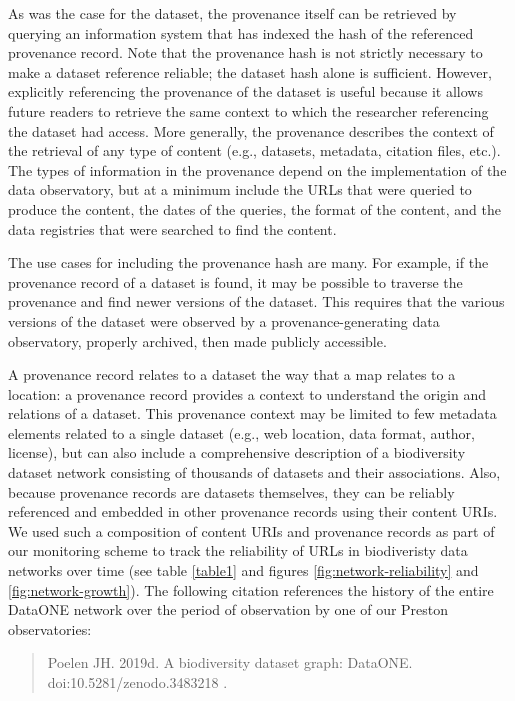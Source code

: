 As was the case for the dataset, the provenance itself can be retrieved by querying an information system that has indexed the hash of the referenced provenance record. Note that the provenance hash is not strictly necessary to make a dataset reference reliable; the dataset hash alone is sufficient. However, explicitly referencing the provenance of the dataset is useful because it allows future readers to retrieve the same context to which the researcher referencing the dataset had access. More generally, the provenance describes the context of the retrieval of any type of content (e.g., datasets, metadata, citation files, etc.). The types of information in the provenance depend on the implementation of the data observatory, but at a minimum include the URLs that were queried to produce the content, the dates of the queries, the format of the content, and the data registries that were searched to find the content.

% 

The use cases for including the provenance hash are many. For example, if the provenance record of a dataset is found, it may be possible to traverse the provenance and find newer versions of the dataset. This requires that the various versions of the dataset were observed by a provenance-generating data observatory, properly archived, then made publicly accessible.

A provenance record relates to a dataset the way that a map relates to a location: a provenance record provides a context to understand the origin and relations of a dataset. This provenance context may be limited to few metadata elements related to a single dataset (e.g., web location, data format, author, license), but can also include a comprehensive description of a biodiversity dataset network consisting of thousands of datasets and their associations. Also, because provenance records are datasets themselves, they can be reliably referenced and embedded in other provenance records using their content URIs. We used such a composition of content URIs and provenance records as part of our monitoring scheme \citep{jorrit_poelen_2018_1410543} to track the reliability of URLs in biodiveristy data networks over time (see table \ref{table1} and figures \ref{fig:network-reliability} and \ref{fig:network-growth}). The following citation references the history of the entire DataONE network over the period of observation by one of our Preston observatories:

\begin{quote}
Poelen JH. 2019d. A biodiversity dataset graph: DataONE.
doi:10.5281/zenodo.3483218 . 
\end{quote}

